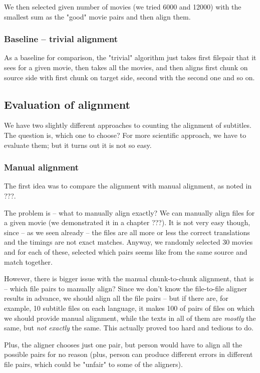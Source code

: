 We then selected given number of movies (we tried 6000 and 12000) with the smallest sum as the "good" movie pairs and then align them.

\subsubsection{Baseline -- trivial alignment}
As a baseline for comparison, the "trivial" algorithm just takes first filepair that it sees for a given movie, then takes all the movies, and then aligns first chunk on source side with first chunk on target side, second with the second one and so on.

\subsection{Evaluation of alignment}
We have two slightly different approaches to counting the alignment of subtitles. The question is, which one to choose? For more scientific approach, we have to evaluate them; but it turns out it is not so easy.

\subsubsection{Manual alignment}
The first idea was to compare the alignment with manual alignment, as noted in ???.

The problem is -- what to manually align exactly? We can manually align files for a given movie (we demonstrated it in a chapter ???). It is not very easy though, since -- as we seen already -- the files are all more or less the correct translations and the timings are not exact matches. Anyway, we randomly selected 30 movies and for each of these, selected which pairs seems like from the same source and match together.

However, there is bigger issue with the manual chunk-to-chunk alignment, that is -- which file pairs to manually align? Since we don't know the file-to-file aligner results in advance, we should align all the file pairs -- but if there are, for example, 10 subtitle files on each language, it makes 100 of pairs of files on which we should provide manual alignment, while the texts in all of them are \emph{mostly} the same, but \emph{not exactly} the same. This actually proved too hard and tedious to do.

Plus, the aligner chooses just one pair, but person would have to align all the possible pairs for no reason (plus, person can produce different errors in different file pairs, which could be "unfair" to some of the aligners).

